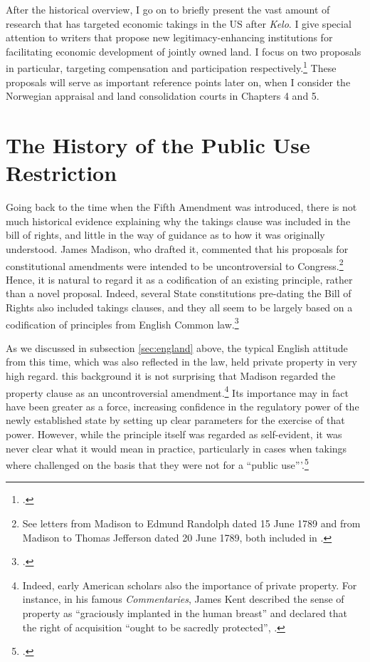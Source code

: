 After the historical overview, I go on to briefly present the vast amount of research that has targeted economic takings in the US after {\it Kelo}. I give special attention to writers that propose new legitimacy-enhancing institutions for facilitating economic development of jointly owned land. I focus on two proposals in particular, targeting compensation and participation respectively.\footcite{lehavi07,heller08} These proposals will serve as important reference points later on, when I consider the Norwegian appraisal and land consolidation courts in Chapters 4 and 5.

\section{The History of the Public Use Restriction}\label{sec:hop}

Going back to the time when the Fifth Amendment was introduced, there is not much historical evidence explaining why the takings clause was included in the bill of rights, and little in the way of guidance as to how it was originally understood. James Madison, who drafted it, commented that his proposals for constitutional amendments were intended to be uncontroversial to Congress.\footnote{See letters from Madison to Edmund Randolph dated 15 June 1789 and from Madison to Thomas Jefferson dated 20 June 1789, both included in \cite{madison79}.}  Hence, it is natural to regard it as a codification of an existing principle, rather than a novel proposal. Indeed, several State constitutions pre-dating the Bill of Rights also included takings clauses, and they all seem to be largely based on a codification of principles from English Common law.\footcite[See][299]{johnson11}

As we discussed in subsection \ref{sec:england} above, the typical English attitude from this time, which was also reflected in the law, held private property in very high regard.  this background it is not surprising that Madison regarded the property clause as an uncontroversial amendment.\footnote{Indeed, early American scholars also  the importance of private property. For instance, in his famous {\it Commentaries}, James Kent described the sense of property as ``graciously implanted in the human breast'' and declared that the right of acquisition ``ought to be sacredly protected'', \cite[see][257]{kent27}.} Its importance may in fact have been greater as a  force, increasing confidence in the regulatory power of the newly established state by setting up clear parameters for the exercise of that power.  However, while the principle itself was regarded as self-evident, it was never clear what it would mean in practice, particularly in cases when takings where challenged on the basis that they were not for a ``public use'''.\footcite[See][317]{johnson11} 

